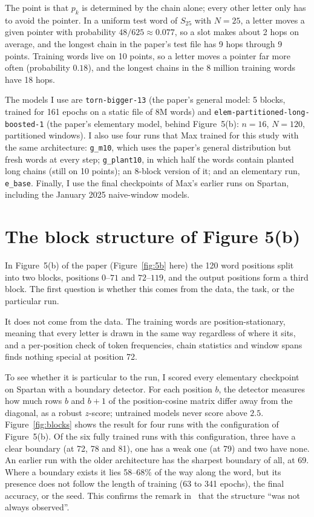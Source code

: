 \documentclass[11pt,a4paper]{article}
\newcommand{\tb}{\texttt{torn-bigger-13}}
\begin{document}
The point is that $p_k$ is determined by the chain alone; every other letter only has to avoid the pointer. In a uniform test word of $S_{25}$ with $N=25$, a letter moves a given pointer with probability $48/625\approx0.077$, so a slot makes about 2 hops on average, and the longest chain in the paper's test file has 9 hops through 9 points. Training words live on 10 points, so a letter moves a pointer far more often (probability $0.18$), and the longest chains in the 8 million training words have 18 hops.

The models I use are \tb{} (the paper's general model: 5 blocks, trained for 161 epochs on a static file of 8M words) and \texttt{elem-partitioned-long-boosted-1} (the paper's elementary model, behind Figure~5(b): $n=16$, $N=120$, partitioned windows). I also use four runs that Max trained for this study with the same architecture: \texttt{g\_m10}, which uses the paper's general distribution but fresh words at every step; \texttt{g\_plant10}, in which half the words contain planted long chains (still on 10 points); an 8-block version of it; and an elementary run, \texttt{e\_base}. Finally, I use the final checkpoints of Max's earlier runs on Spartan, including the January 2025 naive-window models.

\section{The block structure of Figure 5(b)}\label{sec:blocks}

In Figure~5(b) of the paper (Figure~\ref{fig:5b} here) the 120 word positions split into two blocks, positions $0$--$71$ and $72$--$119$, and the output positions form a third block. The first question is whether this comes from the data, the task, or the particular run.

It does not come from the data. The training words are position-stationary, meaning that every letter is drawn in the same way regardless of where it sits, and a per-position check of token frequencies, chain statistics and window spans finds nothing special at position 72.

To see whether it is particular to the run, I scored every elementary checkpoint on Spartan with a boundary detector. For each position $b$, the detector measures how much rows $b$ and $b+1$ of the position-cosine matrix differ away from the diagonal, as a robust $z$-score; untrained models never score above $2.5$. Figure~\ref{fig:blocks} shows the result for four runs with the configuration of Figure~5(b). Of the six fully trained runs with this configuration, three have a clear boundary (at 72, 78 and 81), one has a weak one (at 79) and two have none. An earlier run with the older architecture has the sharpest boundary of all, at 69. Where a boundary exists it lies 58--68\% of the way along the word, but its presence does not follow the length of training (63 to 341 epochs), the final accuracy, or the seed. This confirms the remark in~\cite{paper} that the structure ``was not always observed''.
\end{document}
